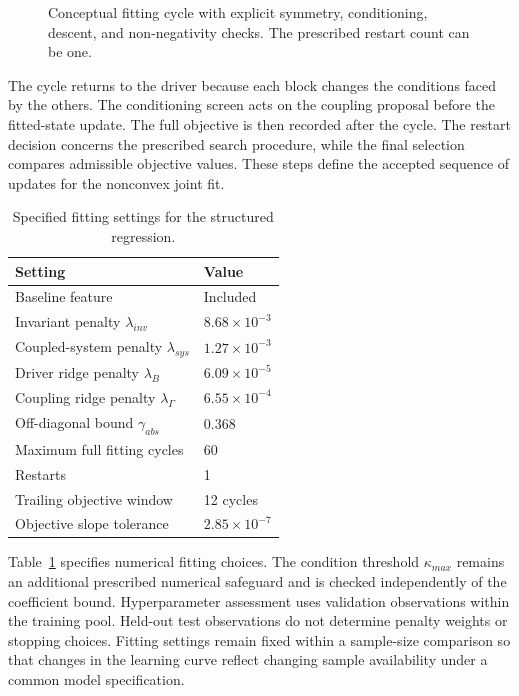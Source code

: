\begin{figure}[htbp]
\centering

\caption{Conceptual fitting cycle with explicit symmetry, conditioning, descent, and non-negativity checks. The prescribed restart count can be one.}
\label{fig:ch5_training_cycle}
\end{figure}

The cycle returns to the driver because each block changes the conditions faced by the others. The conditioning screen acts on the coupling proposal before the fitted-state update. The full objective is then recorded after the cycle. The restart decision concerns the prescribed search procedure, while the final selection compares admissible objective values. These steps define the accepted sequence of updates for the nonconvex joint fit.

\begin{table}[htbp]
\centering
\caption{Specified fitting settings for the structured regression.}
\label{tab:icsor_fitting_settings}
\begin{tabular}{ll}
\toprule
Setting & Value\\
\midrule
Baseline feature & Included\\
Invariant penalty \(\lambda_{inv}\) & \(8.68\times10^{-3}\)\\
Coupled-system penalty \(\lambda_{sys}\) & \(1.27\times10^{-3}\)\\
Driver ridge penalty \(\lambda_B\) & \(6.09\times10^{-5}\)\\
Coupling ridge penalty \(\lambda_{\Gamma}\) & \(6.55\times10^{-4}\)\\
Off-diagonal bound \(\gamma_{abs}\) & 0.368\\
Maximum full fitting cycles & 60\\
Restarts & 1\\
Trailing objective window & 12 cycles\\
Objective slope tolerance & \(2.85\times10^{-7}\)\\
\bottomrule
\end{tabular}
\end{table}

Table~\ref{tab:icsor_fitting_settings} specifies numerical fitting choices. The condition threshold \(\kappa_{max}\) remains an additional prescribed numerical safeguard and is checked independently of the coefficient bound. Hyperparameter assessment uses validation observations within the training pool. Held-out test observations do not determine penalty weights or stopping choices. Fitting settings remain fixed within a sample-size comparison so that changes in the learning curve reflect changing sample availability under a common model specification.

